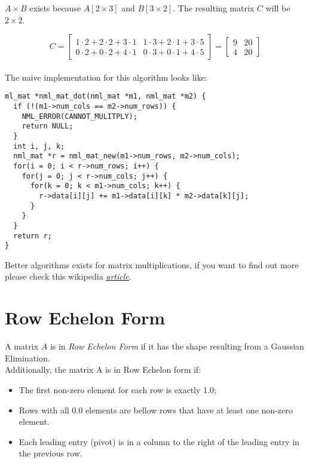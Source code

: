 $A\times B$ exists because $A[2\times 3]$ and $B[3\times 2]$. The resulting matrix $C$ will be $2\times 2$.

$$
C = \left[ \begin{array}{cc}
1\cdot 2 + 2\cdot 2 + 3\cdot 1 & 1\cdot 3 + 2\cdot 1 + 3\cdot 5 \\
0\cdot 2 + 0\cdot 2 + 4\cdot 1 & 0\cdot 3 + 0\cdot 1 + 4\cdot 5
\end{array} \right]
= 
\left[ \begin{array}{cc}
9 & 20 \\
4 & 20
\end{array} \right]
$$
\\
The naive implementation for this algorithm looks like:

\begin{verbatim}
ml_mat *nml_mat_dot(nml_mat *m1, nml_mat *m2) {
  if (!(m1->num_cols == m2->num_rows)) {
    NML_ERROR(CANNOT_MULITPLY);
    return NULL;
  }
  int i, j, k;
  nml_mat *r = nml_mat_new(m1->num_rows, m2->num_cols);
  for(i = 0; i < r->num_rows; i++) {
    for(j = 0; j < r->num_cols; j++) {
      for(k = 0; k < m1->num_cols; k++) {
        r->data[i][j] += m1->data[i][k] * m2->data[k][j];
      }
    }
  }
  return r;
}
\end{verbatim}

Better algorithms exists for matrix multiplications, if you want to find out more please check this wikipedia \href{https://en.wikipedia.org/wiki/Matrix_multiplication_algorithm}{\underline{\it article}}.

\section{Row Echelon Form}

A matrix $A$ is in \textit{Row Echelon Form} if it has the shape resulting from a Gaussian Elimination.
\\

Additionally, the matrix A is in Row Echelon form if:

\begin{itemize}
\item The first non-zero element for each row is exactly 1.0;
\item Rows with all 0.0 elements are bellow rows that have at least one non-zero element.
\item Each leading entry (pivot) is in a column to the right of the leading entry in the previous row.
\end{itemize}

